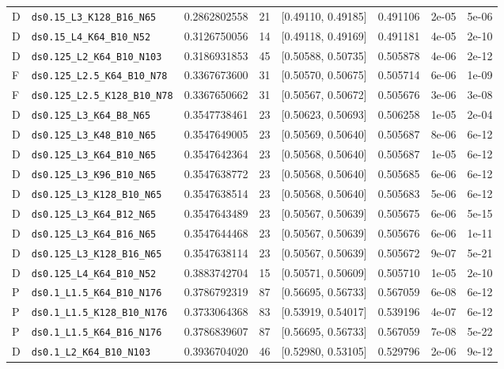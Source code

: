 \begin{longtable}{@{}llrllllr@{}}
D & \texttt{ds0.15\_L3\_K128\_B16\_N65} & 0.2862802558 & 21 & [0.49110, 0.49185] & 0.491106 & 2e-05 & 5e-06\\
D & \texttt{ds0.15\_L4\_K64\_B10\_N52} & 0.3126750056 & 14 & [0.49118, 0.49169] & 0.491181 & 4e-05 & 2e-10\\
D & \texttt{ds0.125\_L2\_K64\_B10\_N103} & 0.3186931853 & 45 & [0.50588, 0.50735] & 0.505878 & 4e-06 & 2e-12\\
F & \texttt{ds0.125\_L2.5\_K64\_B10\_N78} & 0.3367673600 & 31 & [0.50570, 0.50675] & 0.505714 & 6e-06 & 1e-09\\
F & \texttt{ds0.125\_L2.5\_K128\_B10\_N78} & 0.3367650662 & 31 & [0.50567, 0.50672] & 0.505676 & 3e-06 & 3e-08\\
D & \texttt{ds0.125\_L3\_K64\_B8\_N65} & 0.3547738461 & 23 & [0.50623, 0.50693] & 0.506258 & 1e-05 & 2e-04\\
D & \texttt{ds0.125\_L3\_K48\_B10\_N65} & 0.3547649005 & 23 & [0.50569, 0.50640] & 0.505687 & 8e-06 & 6e-12\\
D & \texttt{ds0.125\_L3\_K64\_B10\_N65} & 0.3547642364 & 23 & [0.50568, 0.50640] & 0.505687 & 1e-05 & 6e-12\\
D & \texttt{ds0.125\_L3\_K96\_B10\_N65} & 0.3547638772 & 23 & [0.50568, 0.50640] & 0.505685 & 6e-06 & 6e-12\\
D & \texttt{ds0.125\_L3\_K128\_B10\_N65} & 0.3547638514 & 23 & [0.50568, 0.50640] & 0.505683 & 5e-06 & 6e-12\\
D & \texttt{ds0.125\_L3\_K64\_B12\_N65} & 0.3547643489 & 23 & [0.50567, 0.50639] & 0.505675 & 6e-06 & 5e-15\\
D & \texttt{ds0.125\_L3\_K64\_B16\_N65} & 0.3547644468 & 23 & [0.50567, 0.50639] & 0.505676 & 6e-06 & 1e-11\\
D & \texttt{ds0.125\_L3\_K128\_B16\_N65} & 0.3547638114 & 23 & [0.50567, 0.50639] & 0.505672 & 9e-07 & 5e-21\\
D & \texttt{ds0.125\_L4\_K64\_B10\_N52} & 0.3883742704 & 15 & [0.50571, 0.50609] & 0.505710 & 1e-05 & 2e-10\\
P & \texttt{ds0.1\_L1.5\_K64\_B10\_N176} & 0.3786792319 & 87 & [0.56695, 0.56733] & 0.567059 & 6e-08 & 6e-12\\
P & \texttt{ds0.1\_L1.5\_K128\_B10\_N176} & 0.3733064368 & 83 & [0.53919, 0.54017] & 0.539196 & 4e-07 & 6e-12\\
P & \texttt{ds0.1\_L1.5\_K64\_B16\_N176} & 0.3786839607 & 87 & [0.56695, 0.56733] & 0.567059 & 7e-08 & 5e-22\\
D & \texttt{ds0.1\_L2\_K64\_B10\_N103} & 0.3936704020 & 46 & [0.52980, 0.53105] & 0.529796 & 2e-06 & 9e-12\\

\end{longtable}
